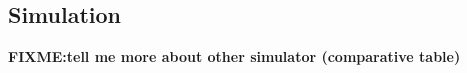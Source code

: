 \documentclass[10pt,conference,compsocconf]{IEEEtran}
\begin{document}
\subsection{Simulation}

\textbf{FIXME:tell me more about other simulator (comparative table)} 

\end{document}
